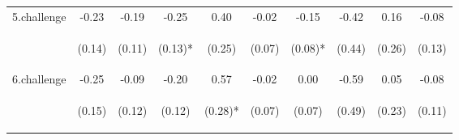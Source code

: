 \begin{center}
\begin{tabular}{lccccccccc}
\noalign{\smallskip}5.challenge & -0.23 & -0.19 & -0.25 & 0.40 & -0.02 & -0.15 & -0.42 & 0.16 & -0.08\\
 & \begin{footnotesize}(0.14)\end{footnotesize} & \begin{footnotesize}(0.11)\end{footnotesize} & \begin{footnotesize}(0.13)*\end{footnotesize} & \begin{footnotesize}(0.25)\end{footnotesize} & \begin{footnotesize}(0.07)\end{footnotesize} & \begin{footnotesize}(0.08)*\end{footnotesize} & \begin{footnotesize}(0.44)\end{footnotesize} & \begin{footnotesize}(0.26)\end{footnotesize} & \begin{footnotesize}(0.13)\end{footnotesize}\\
\noalign{\smallskip}6.challenge & -0.25 & -0.09 & -0.20 & 0.57 & -0.02 & 0.00 & -0.59 & 0.05 & -0.08\\
 & \begin{footnotesize}(0.15)\end{footnotesize} & \begin{footnotesize}(0.12)\end{footnotesize} & \begin{footnotesize}(0.12)\end{footnotesize} & \begin{footnotesize}(0.28)*\end{footnotesize} & \begin{footnotesize}(0.07)\end{footnotesize} & \begin{footnotesize}(0.07)\end{footnotesize} & \begin{footnotesize}(0.49)\end{footnotesize} & \begin{footnotesize}(0.23)\end{footnotesize} & \begin{footnotesize}(0.11)\end{footnotesize}\\

\end{tabular}
\end{center}
